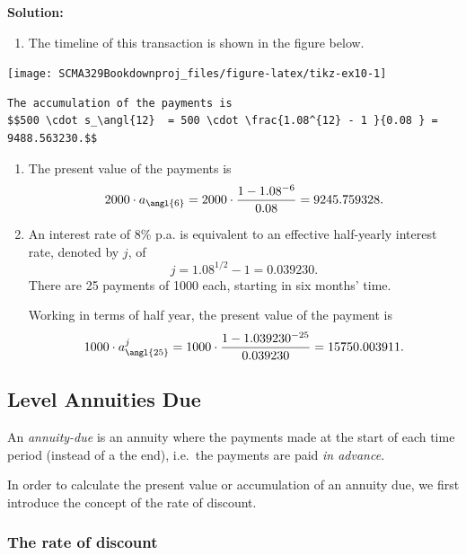 \documentclass[
]{book}
\providecommand{\tightlist}{%
  \setlength{\itemsep}{0pt}\setlength{\parskip}{0pt}}
\theoremstyle{definition}
\theoremstyle{definition}
\theoremstyle{definition}
\theoremstyle{definition}
\theoremstyle{remark}
\begin{document}
\textbf{Solution:}

\begin{enumerate}
\def\labelenumi{\arabic{enumi}.}
\tightlist
\item
  The timeline of this transaction is shown in the figure below.
\end{enumerate}

\begin{center}\texttt{[image: SCMA329Bookdownproj\_files/figure-latex/tikz-ex10-1]} \end{center}

\begin{verbatim}
The accumulation of the payments is
$$500 \cdot s_\angl{12}  = 500 \cdot \frac{1.08^{12} - 1 }{0.08 } = 9488.563230.$$
\end{verbatim}

\begin{enumerate}
\def\labelenumi{\arabic{enumi}.}
\setcounter{enumi}{1}
\item
  The present value of the payments is
  \[2000\cdot a_\angl{6}  = 2000 \cdot \frac{1 - 1.08^{-6} }{0.08 } = 9245.759328.\]
\item
  An interest rate of 8\% p.a. is equivalent to an effective
  half-yearly interest rate, denoted by \(j\), of
  \[j = 1.08^{1/2} -1 = 0.039230.\] There are 25 payments of 1000
  each, starting in six months' time.

  Working in terms of half year, the present value of the payment is
  \[1000 \cdot a^j_\angl{25} = 1000 \cdot \frac{1 - 1.039230^{-25} }{0.039230 } = 15750.003911.\]
\end{enumerate}

\hypertarget{level-annuities-due}{%
\subsection{Level Annuities Due}\label{level-annuities-due}}

An \emph{annuity-due} is an annuity where the payments made at the start of
each time period (instead of a the end), i.e.~the payments are paid \emph{in
advance}.

In order to calculate the present value or accumulation of an annuity
due, we first introduce the concept of the rate of discount.

\hypertarget{the-rate-of-discount}{%
\subsubsection*{The rate of discount}\label{the-rate-of-discount}}
\end{document}
